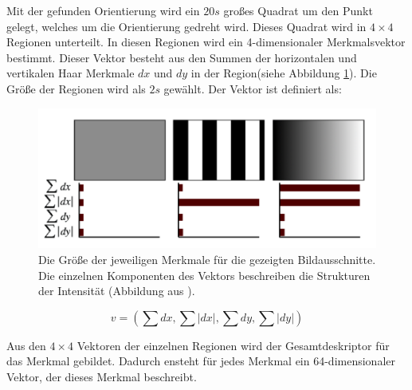 Mit der gefunden Orientierung wird ein $20s$ großes Quadrat um den Punkt gelegt, welches um die Orientierung gedreht wird.
Dieses Quadrat wird in $4 \times 4$ Regionen unterteilt. In diesen Regionen wird ein 4-dimensionaler Merkmalsvektor bestimmt. Dieser Vektor besteht aus den Summen der horizontalen und vertikalen Haar Merkmale $dx$ und $dy$ in der Region(siehe Abbildung \ref{fig:surfFeature}). 
Die Größe der Regionen wird als $2s$ gewählt. Der Vektor ist definiert als: 

\begin{figure}[h]
    \centering
		\includegraphics[scale=0.4]{bilder/surfFeature.png}
    	\caption{Die Größe der jeweiligen Merkmale für die gezeigten Bildausschnitte. Die einzelnen Komponenten des Vektors beschreiben die Strukturen der Intensität (Abbildung aus \cite{Bay:2008:SRF:1370312.1370556}).}
\label{fig:surfFeature}
\end{figure} 


\[
v = (\sum dx, \sum  |dx|, \sum dy, \sum |dy|)
\]

Aus den $4 \times 4$ Vektoren der einzelnen Regionen wird der Gesamtdeskriptor für das Merkmal gebildet.
Dadurch ensteht für jedes Merkmal ein 64-dimensionaler Vektor, der dieses Merkmal beschreibt.